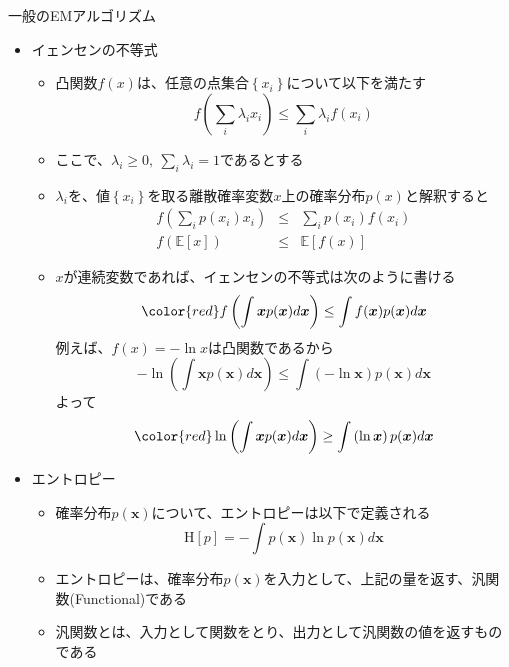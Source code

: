 \documentclass[dvipdfmx,notheorems,t]{beamer}
\begin{document}
\begin{frame}{一般のEMアルゴリズム}

\begin{itemize}
	\item イェンセンの不等式
	\begin{itemize}
		\item \alert{凸関数}$f(x)$は、任意の点集合$\left\{ x_i \right\}$について以下を満たす
		\begin{equation}
			f \left( \sum_i \lambda_i x_i \right) \le \sum_i \lambda_i f(x_i)
		\end{equation}
		\item ここで、\color{red}$\lambda_i \ge 0, \ \sum_i \lambda_i = 1$\normalcolor であるとする
		\newline
		\item $\lambda_i$を、値$\left\{ x_i \right\}$を取る離散確率変数$x$上の確率分布$p(x)$と解釈すると
		\begin{eqnarray}
			f \left( \sum_i p(x_i) x_i \right) &\le& \sum_i p(x_i) f(x_i) \nonumber \\
			f \left( \mathbb{E}[x] \right) &\le& \mathbb{E}[f(x)]
		\end{eqnarray}
		
		\item $x$が連続変数であれば、イェンセンの不等式は次のように書ける
		\begin{equation}
			\color{red}f \left( \int \bm{x} p(\bm{x}) d\bm{x} \right) \le \int f(\bm{x}) p(\bm{x}) d\bm{x}\normalcolor
		\end{equation}
		例えば、$f(x) = -\ln x$は凸関数であるから
		\begin{equation}
			-\ln \left( \int \bm{x} p(\bm{x}) d\bm{x} \right) \le \int \left( - \ln \bm{x} \right) p(\bm{x}) d\bm{x}
		\end{equation}
		よって
		\begin{equation}
			\color{red}\ln \left( \int \bm{x} p(\bm{x}) d\bm{x} \right) \ge \int \left( \ln \bm{x} \right) p(\bm{x}) d\bm{x}\normalcolor
		\end{equation}
	\end{itemize}
	
	\framebreak
	
	\item エントロピー
	\begin{itemize}
		\item 確率分布$p(\bm{x})$について、エントロピーは以下で定義される
		\begin{equation}
			\mathrm{H} [p] = -\int p(\bm{x}) \ln p(\bm{x}) d\bm{x}
		\end{equation}
		\item エントロピーは、確率分布$p(\bm{x})$を入力として、上記の量を返す、\alert{汎関数}(Functional)である
		\item 汎関数とは、入力として関数をとり、出力として汎関数の値を返すものである
	\end{itemize}
	

\end{itemize}
\end{frame}
\end{document}
